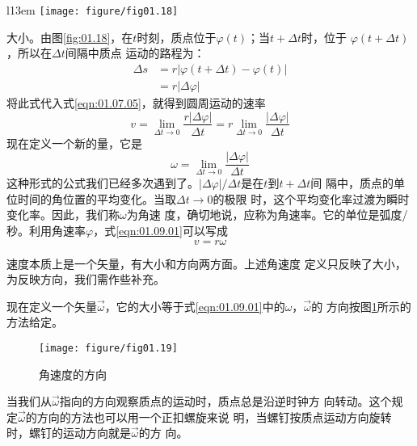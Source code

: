 \documentclass[../outline-of-mechanics.tex]{subfiles}
\begin{document}
\begin{wrapfigure}[8]{l}{13em}
  \vspace{-0.5em}
  \centering \small
  \texttt{[image: figure/fig01.18]}
  \caption{圆周运动的速率}
  \label{fig:01.18}
\end{wrapfigure}
\noindent 大小。由图\ref{fig:01.18}，在$t$时刻，质点位于$\varphi\left(t\right)$；当$t+\Delta t$时，位于
$\varphi\left(t+\Delta t\right)$，所以在$\Delta t$间隔中质点
运动的路程为：
\setlength{\mathindent}{2em}
\begin{equation*}
  \begin{aligned}
    \Delta s & =r|\varphi\left(t+\Delta t\right)-\varphi\left(t\right)| \\
             & =r|\Delta \varphi|
  \end{aligned}
\end{equation*}
将此式代入式\eqref{eqn:01.07.05}，就得到圆周运动的速率
\setlength{\mathindent}{6em}
\begin{equation}\label{eqn:01.09.01}
  v=\lim _{\Delta t \rightarrow 0} \frac{r|\Delta \varphi|}{\Delta t}=r \lim _{\Delta t \rightarrow 0} \frac{|\Delta \varphi|}{\Delta t}
\end{equation}
现在定义一个新的量，它是
\begin{equation}\label{eqn:01.09.02}
  \omega=\lim _{\Delta t \rightarrow 0} \frac{|\Delta \varphi|}{\Delta t}
\end{equation}
这种形式的公式我们已经多次遇到了。$|\Delta\varphi|/\Delta t$是在$t$到$t+\Delta t$间
隔中，质点的单位时间的角位置的平均变化。当取$\Delta t\rightarrow 0$的极限
时，这个平均变化率过渡为瞬时变化率。因此，我们称$\omega$为角速
度，确切地说，应称为角速率。它的单位是弧度/秒。利用角速率$\varphi$，式\eqref{eqn:01.09.01}可以写成
\begin{equation}\label{eqn:01.09.03}
  v=r\omega
\end{equation}

速度本质上是一个矢量，有大小和方向两方面。上述角速度
定义只反映了大小，为反映方向，我们需作些补充。

现在定义一个矢量$\vec{\omega}$，它的大小等于式\eqref{eqn:01.09.01}中的$\omega$，$ \vec{\omega}$的
方向按图\ref{fig:01.19}所示的方法给定。
\begin{figure}[!h]
  \texttt{[image: figure/fig01.19]}
  \caption{角速度的方向}
  \label{fig:01.19}
\end{figure}

\noindent 当我们从$ \vec{\omega}$指向的方向观察质点的运动时，质点总是沿逆时钟方
向转动。这个规定$ \vec{\omega}$的方向的方法也可以用一个正扣螺旋来说
明，当螺钉按质点运动方向旋转时，螺钉的运动方向就是$ \vec{\omega}$的方
向。
\end{document}
